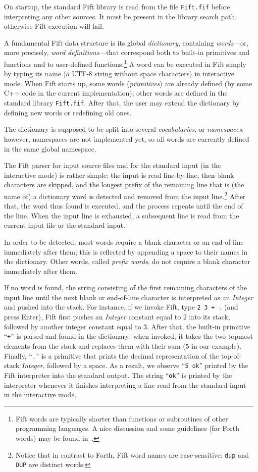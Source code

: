 \documentclass[12pt,oneside]{article}
\begin{document}
On startup, the standard Fift library is read from the file {\tt Fift.fif} before interpreting any other sources. It must be present in the library search path, otherwise Fift execution will fail.

A fundamental Fift data structure is its global {\em dictionary}, containing {\em words}---or, more precisely, {\em word definitions\/}---that correspond both to built-in primitives and functions and to user-defined functions.\footnote{Fift words are typically shorter than functions or subroutines of other programming languages. A nice discussion and some guidelines (for Forth words) may be found in~\cite{Brodie2}.} A word can be executed in Fift simply by typing its name (a UTF-8 string without space characters) in interactive mode. When Fift starts up, some words ({\em primitives\/}) are already defined (by some C++ code in the current implementation); other words are defined in the standard library {\tt Fift.fif}. After that, the user may extend the dictionary by defining new words or redefining old ones.

The dictionary is supposed to be split into several {\em vocabularies}, or {\em name\-spaces}; however, namespaces are not implemented yet, so all words are currently defined in the same global namespace.

The Fift parser for input source files and for the standard input (in the interactive mode) is rather simple: the input is read line-by-line, then blank characters are skipped, and the longest prefix of the remaining line that is (the name of) a dictionary word is detected and removed from the input line.\footnote{Notice that in contrast to Forth, Fift word names are case-sensitive: {\tt dup} and {\tt DUP} are distinct words.} After that, the word thus found is executed, and the process repeats until the end of the line. When the input line is exhausted, a subsequent line is read from the current input file or the standard input.

In order to be detected, most words require a blank character or an end-of-line immediately after them; this is reflected by appending a space to their names in the dictionary. Other words, called {\em prefix words}, do not require a blank character immediately after them.

If no word is found, the string consisting of the first remaining characters of the input line until the next blank or end-of-line character is interpreted as an {\em Integer\/} and pushed into the stack. For instance, if we invoke Fift, type {\tt 2 3 + .} (and press Enter), Fift first pushes an {\em Integer\/} constant equal to $2$ into its stack, followed by another integer constant equal to $3$. After that, the built-in primitive ``{\tt +}'' is parsed and found in the dictionary; when invoked, it takes the two topmost elements from the stack and replaces them with their sum ($5$ in our example). Finally, ``{\tt .}'' is a primitive that prints the decimal representation of the top-of-stack {\em Integer}, followed by a space. As a result, we observe ``{\tt 5 ok}'' printed by the Fift interpreter into the standard output. The string ``{\tt ok}'' is printed by the interpreter whenever it finishes interpreting a line read from the standard input in the interactive mode.
\end{document}
